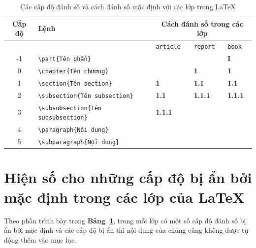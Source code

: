 \documentclass[12pt,a4paper]{article}
\newcommand{\tab}[1]{\textbf{Bảng~#1}}
\newcommand{\head}[1]{\textbf{#1}}
\begin{document}
	\begin{table}[h]
		\begin{center}
			\begin{tabular}{cllll}\toprule
				\head{Cấp độ} & \head{Lệnh}  & \multicolumn{3}{c}{\head{Cách đánh số trong các lớp}} \\ \midrule
				&  & \Verb|article| & \Verb|report| & \Verb|book| \\ \midrule
				-1  & \Verb|\part{Tên phần}| & &  & \textbf{I} \\ \midrule
				0  & \Verb|\chapter{Tên chương}| & & \textbf{1} & \textbf{1} \\ \midrule
				1  & \Verb|\section{Tên section}| & \textbf{1} & \textbf{1.1} & \textbf{1.1} \\ \midrule
				2  & \Verb|\subsection{Tên subsection}| & \textbf{1.1} & \textbf{1.1.1} & \textbf{1.1.1} \\ \midrule
				3  & \Verb|\subsubsection{Tên subsubsection}| & \textbf{1.1.1} &  &  \\ \midrule
				4  & \Verb|\paragraph{Nội dung}| &  &  &  \\ \midrule
				5  & \Verb|\subparagraph{Nội dung}| &  &  &  \\ \bottomrule
			\end{tabular}
		\end{center}
		\caption{Các cấp độ đánh số và cách đánh số mặc định với các lớp trong \LaTeX} \label{Tab:7cap-danhso}
	\end{table}		
	
\section{Hiện số cho những cấp độ bị ẩn bởi mặc định trong các lớp của \LaTeX}
	Theo phần trình bày trong \tab{\ref{Tab:7cap-danhso}}, trong mỗi lớp có một số cấp độ đánh số bị ẩn bởi mặc định và các cấp độ bị ẩn thì nội dung của chúng cũng không được tự động thêm vào mục lục.\\ 
	
\end{document}
